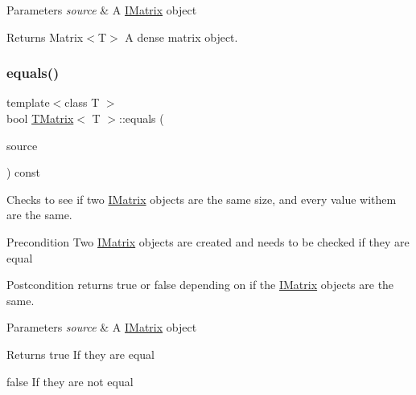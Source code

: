 \begin{DoxyParams}{Parameters}
{\em source} & A \mbox{\hyperlink{class_i_matrix}{I\+Matrix}} object \\
\hline
\end{DoxyParams}
\begin{DoxyReturn}{Returns}
Matrix$<$\+T$>$ A dense matrix object. 
\end{DoxyReturn}
\mbox{\label{class_t_matrix_acdc681004db638f284a417a82e114f0f}} 
\subsubsection{\texorpdfstring{equals()}{equals()}\hspace{0.1cm}{\footnotesize\ttfamily [1/6]}}
{\footnotesize\ttfamily template$<$class T $>$ \\
bool \mbox{\hyperlink{class_t_matrix}{T\+Matrix}}$<$ T $>$\+::equals (\begin{DoxyParamCaption}\item[{const \mbox{\hyperlink{class_i_matrix}{I\+Matrix}}$<$ \mbox{\hyperlink{class_matrix}{Matrix}}$<$ T $>$, T $>$ \&}]{source }\end{DoxyParamCaption}) const}



Checks to see if two \mbox{\hyperlink{class_i_matrix}{I\+Matrix}} objects are the same size, and every value withem are the same. 

\begin{DoxyPrecond}{Precondition}
Two \mbox{\hyperlink{class_i_matrix}{I\+Matrix}} objects are created and needs to be checked if they are equal 
\end{DoxyPrecond}
\begin{DoxyPostcond}{Postcondition}
returns true or false depending on if the \mbox{\hyperlink{class_i_matrix}{I\+Matrix}} objects are the same.
\end{DoxyPostcond}

\begin{DoxyParams}{Parameters}
{\em source} & A \mbox{\hyperlink{class_i_matrix}{I\+Matrix}} object \\
\hline
\end{DoxyParams}
\begin{DoxyReturn}{Returns}
true If they are equal 

false If they are not equal 
\end{DoxyReturn}
\mbox{\label{class_t_matrix_adf09f7a3051afe14137e6abf075cb42e}} 
